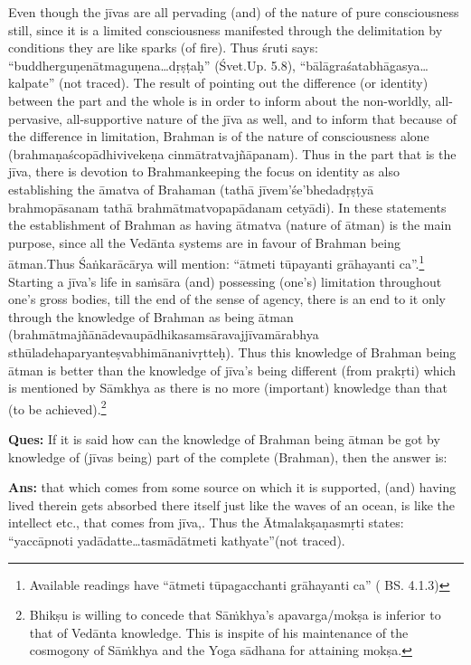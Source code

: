 Even though the jīvas are all pervading (and) of the nature of pure consciousness still, since it is a limited consciousness manifested through the delimitation by conditions they are like sparks (of fire). Thus śruti says: “buddherguṇenātmaguṇena…dṛṣṭaḥ” (Śvet.Up. 5.8), “bālāgra\-śatabhāgasya…kalpate” (not traced). The result of pointing out the difference (or identity) between the part and the whole is in order to inform about the non-worldly, all-pervasive, all-supportive nature of the jīva as well, and to inform that because of the difference in limitation, Brahman is of the nature of consciousness alone (brahmaṇaścopādhivivekeṇa cinmātratvajñāpanam). Thus in the part that is the jīva, there is devotion to Brahmankeeping the focus on identity as also establishing the āmatva of Brahaman (tathā jīvem’śe’bhedadṛṣṭyā brahmopāsanam tathā brahmātmatvopapādanam cetyādi). In these statements the  establishment of Brahman as having ātmatva (nature of ātman) is the main purpose, since all the Vedānta systems are in favour of Brahman being ātman.Thus Śaṅkarācārya  will mention: “ātmeti tūpayanti grāhayanti ca”.\footnote{Available readings have “ātmeti tūpagacchanti grāhayanti ca” ( BS. 4.1.3)}   Starting a jīva’s life in saṁsāra (and) possessing (one’s) limitation throughout one’s gross bodies, till the end of the sense of agency, there is an end to it only through the knowledge of Brahman as being ātman (brahmātmajñānādevaupādhikasamsāravajjīvamārabhya sthūladehaparyanteṣvabhimānanivṛtteḥ). Thus this knowledge of Brahman being ātman is better than the knowledge of jīva’s being different (from prakṛti) which is mentioned by Sāmkhya as there is no more (important) knowledge than that (to be achieved).\footnote{Bhikṣu is willing to concede that Sāṁkhya’s apavarga/mokṣa is inferior to that of Vedānta knowledge. This is inspite of his maintenance of the cosmogony of Sāṁkhya and the Yoga sādhana for attaining mokṣa.}  

\textbf{Ques:} If it is said how can the knowledge of Brahman being ātman be got by knowledge of (jīvas being) part of the complete (Brahman), then the answer is:

\textbf{Ans:} that which comes from some source on which it is supported, (and) having lived therein gets absorbed there itself just like the waves of an ocean, is like the intellect etc., that comes from jīva,. Thus the Ātmalakṣaṇasmṛti states: “yaccāpnoti yadādatte…tasmādātmeti kathyate”(not traced).

